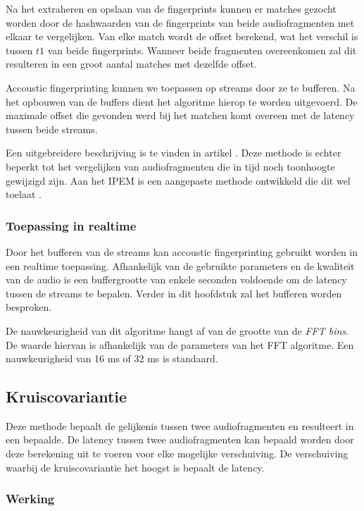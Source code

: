 Na het extraheren en opslaan van de fingerprints kunnen er matches gezocht worden door de hashwaarden van de fingerprints van beide audiofragmenten met elkaar te vergelijken. Van elke match wordt de offset berekend, wat het verschil is tussen $ t1 $ van beide fingerprints. Wanneer beide fragmenten overeenkomen zal dit resulteren in een groot aantal matches met dezelfde offset. 

Accoustic fingerprinting kunnen we toepassen op streams door ze te bufferen. Na het opbouwen van de buffers dient het algoritme hierop te worden uitgevoerd. De maximale offset die gevonden werd bij het matchen komt overeen met de latency tussen beide streams.

Een uitgebreidere beschrijving is te vinden in artikel \cite{Wang2003a}. Deze methode is echter beperkt tot het vergelijken van audiofragmenten die in tijd noch toonhoogte gewijzigd zijn. Aan het IPEM is een aangepaste methode ontwikkeld die dit wel toelaat \cite{six2014panako}.

\subsubsection{Toepassing in realtime}

Door het bufferen van de streams kan accoustic fingerprinting gebruikt worden in een realtime toepassing. Afhankelijk van de gebruikte parameters en de kwaliteit van de audio is een buffergrootte van enkele seconden voldoende om de latency tussen de streams te bepalen. Verder in dit hoofdstuk zal het bufferen worden besproken.

De nauwkeurigheid van dit algoritme hangt af van de grootte van de \textit{FFT bins}. De waarde hiervan is afhankelijk van de parameters van het FFT algoritme. Een nauwkeurigheid van 16 ms of 32 ms is standaard.

\subsection{Kruiscovariantie}

Deze methode bepaalt de gelijkenis tussen twee audiofragmenten en resulteert in een bepaalde. De latency tussen twee audiofragmenten kan bepaald worden door deze berekening uit te voeren voor elke mogelijke verschuiving. De verschuiving waarbij de kruiscovariantie het hoogst is bepaalt de latency.

\subsubsection{Werking}

